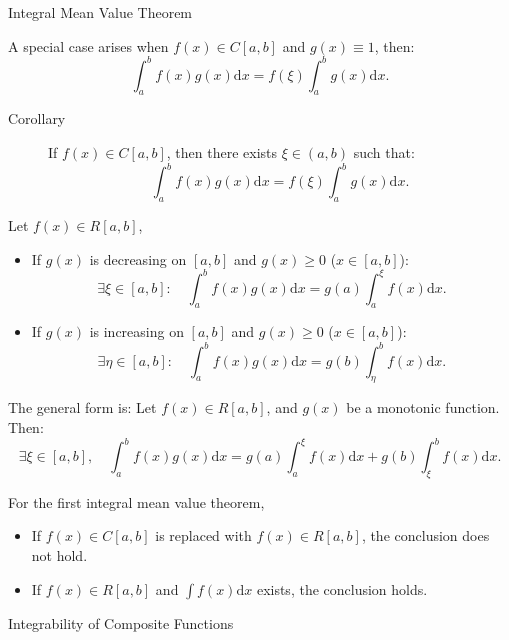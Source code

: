 \documentclass[11pt]{../../TexTemplate/elegantbook}
\begin{document}
\begin{theorem}{Integral Mean Value Theorem}
\begin{description}
            A special case arises when \( f(x) \in C[a, b] \) and \( g(x) \equiv 1 \), then:
            \[
            \int_{a}^{b} f(x)g(x) \mathrm{d}x = f(\xi) \int_{a}^{b} g(x) \mathrm{d}x.
            \]
            \begin{description}
                \item[Corollary] If \( f(x) \in C[a, b] \), then there exists \( \xi \in (a, b) \) such that:
                    \[
                    \int_{a}^b f(x)g(x) \mathrm{d}x = f(\xi) \int_{a}^b g(x) \mathrm{d}x.
                    \]
            \end{description} 
        \item[Second Integral Mean Value Theorem (Bonnet Formula)] Let \( f(x) \in R[a, b] \),
            \begin{itemize}
            \item If \( g(x) \) is decreasing on \( [a, b] \) and \( g(x) \geqslant 0 \) (\( x \in [a, b] \)):
            \[
            \exists \xi \in [a, b]: \quad \int_{a}^{b} f(x)g(x) \mathrm{d}x = g(a)\int_{a}^{\xi} f(x) \mathrm{d}x.
            \]
            \item If \( g(x) \) is increasing on \( [a, b] \) and \( g(x) \geqslant 0 \) (\( x \in [a, b] \)):
            \[
            \exists \eta \in [a, b]: \quad \int_{a}^{b} f(x)g(x) \mathrm{d}x = g(b)\int_{\eta}^{b} f(x) \mathrm{d}x.
            \]
            \end{itemize}
            The general form is:
            Let \( f(x) \in R[a, b] \), and \( g(x) \) be a monotonic function. Then:
            \[
            \exists \xi \in [a, b], \quad \int_{a}^{b} f(x)g(x) \mathrm{d}x = g(a)\int_{a}^{\xi} f(x) \mathrm{d}x + g(b)\int_{\xi}^{b} f(x) \mathrm{d}x.
            \]
    \end{description}
\end{theorem}

\begin{note}
    For the first integral mean value theorem, 
    \begin{itemize}
        \item If \( f(x) \in C[a, b] \) is replaced with \( f(x) \in R[a, b] \), the conclusion does not hold.
        \item If \( f(x) \in R[a, b] \) and \( \int f(x)\mathrm{d}x \) exists, the conclusion holds.
    \end{itemize}
\end{note}


\begin{leftbarTitle}{Integrability of Composite Functions}\end{leftbarTitle}
\end{document}
